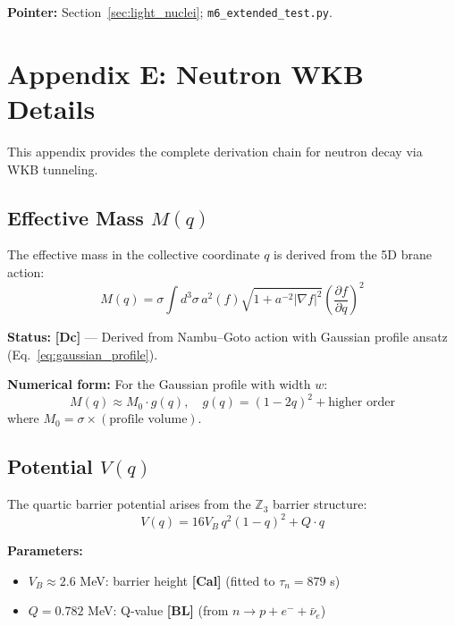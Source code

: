 \documentclass[11pt,a4paper]{article}
\newcommand{\tagDc}{\textcolor{blue!70!black}{\textbf{[Dc]}}}
\newcommand{\tagCal}{\textcolor{purple!70!black}{\textbf{[Cal]}}}
\newcommand{\tagBL}{\textcolor{gray!70!black}{\textbf{[BL]}}}
\begin{document}
\textbf{Pointer:} Section~\ref{sec:light_nuclei}; \texttt{m6\_extended\_test.py}.

\section{Appendix E: Neutron WKB Details}
\label{app:wkb}

This appendix provides the complete derivation chain for neutron decay via WKB tunneling.

\subsection{Effective Mass $M(q)$}

The effective mass in the collective coordinate $q$ is derived from the 5D brane action:
\begin{equation}
    M(q) = \sigma \int d^3\sigma \, a^2(f) \sqrt{1 + a^{-2}|\nabla f|^2} \left( \frac{\partial f}{\partial q} \right)^2
\end{equation}

\textbf{Status:} \tagDc{} --- Derived from Nambu--Goto action with Gaussian profile ansatz (Eq.~\ref{eq:gaussian_profile}).

\textbf{Numerical form:} For the Gaussian profile with width $w$:
\begin{equation}
    M(q) \approx M_0 \cdot g(q), \quad g(q) = (1-2q)^2 + \text{higher order}
\end{equation}
where $M_0 = \sigma \times (\text{profile volume})$.

\subsection{Potential $V(q)$}

The quartic barrier potential arises from the $\mathbb{Z}_3$ barrier structure:
\begin{equation}
    V(q) = 16 V_B \, q^2 (1-q)^2 + Q \cdot q
\end{equation}

\textbf{Parameters:}
\begin{itemize}[nosep]
    \item $V_B \approx 2.6$ MeV: barrier height \tagCal{} (fitted to $\tau_n = 879$ s)
    \item $Q = 0.782$ MeV: Q-value \tagBL{} (from $n \to p + e^- + \bar{\nu}_e$)
\end{itemize}
\end{document}
